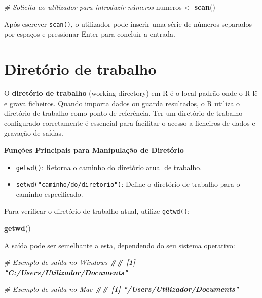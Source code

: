 \documentclass[
]{book}
\newenvironment{Shaded}{\begin{snugshade}}{\end{snugshade}}
\newcommand{\CommentTok}[1]{\textcolor[rgb]{0.56,0.35,0.01}{\textit{#1}}}
\newcommand{\DocumentationTok}[1]{\textcolor[rgb]{0.56,0.35,0.01}{\textbf{\textit{#1}}}}
\newcommand{\FunctionTok}[1]{\textcolor[rgb]{0.13,0.29,0.53}{\textbf{#1}}}
\newcommand{\NormalTok}[1]{#1}
\newcommand{\OtherTok}[1]{\textcolor[rgb]{0.56,0.35,0.01}{#1}}
\providecommand{\tightlist}{%
  \setlength{\itemsep}{0pt}\setlength{\parskip}{0pt}}
\begin{document}
\begin{Shaded}
\begin{Highlighting}[]
\CommentTok{\# Solicita ao utilizador para introduzir números}
\NormalTok{numeros }\OtherTok{\textless{}{-}} \FunctionTok{scan}\NormalTok{()}
\end{Highlighting}
\end{Shaded}

Após escrever \texttt{scan()}, o utilizador pode inserir uma série de números
separados por espaços e pressionar Enter para concluir a entrada.

\section{Diretório de trabalho}\label{diretuxf3rio-de-trabalho}

O \textbf{diretório de trabalho} (working directory) em R é o local padrão
onde o R lê e grava ficheiros. Quando importa dados ou guarda
resultados, o R utiliza o diretório de trabalho como ponto de
referência. Ter um diretório de trabalho configurado corretamente é
essencial para facilitar o acesso a ficheiros de dados e gravação de
saídas.

\textbf{Funções Principais para Manipulação de Diretório}

\begin{itemize}
\tightlist
\item
  \texttt{getwd()}: Retorna o caminho do diretório atual de trabalho.
\item
  \texttt{setwd("caminho/do/diretorio")}: Define o diretório de trabalho para
  o caminho especificado.
\end{itemize}

Para verificar o diretório de trabalho atual, utilize \texttt{getwd()}:

\begin{Shaded}
\begin{Highlighting}[]
\FunctionTok{getwd}\NormalTok{()}
\end{Highlighting}
\end{Shaded}

A saída pode ser semelhante a esta, dependendo do seu sistema operativo:

\begin{Shaded}
\begin{Highlighting}[]
\CommentTok{\# Exemplo de saída no Windows}
\DocumentationTok{\#\# [1] "C:/Users/Utilizador/Documents"}

\CommentTok{\# Exemplo de saída no Mac}
\DocumentationTok{\#\# [1] "/Users/Utilizador/Documents"}
\end{Highlighting}
\end{Shaded}
\end{document}
